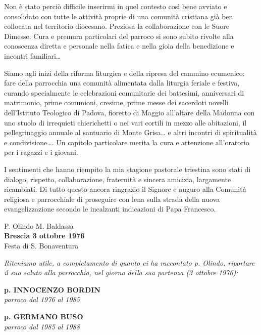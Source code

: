 Non è stato perciò difficile inserirmi in quel contesto così bene avviato e consolidato con tutte le attività proprie di una comunità cristiana già ben collocata nel territorio diocesano. Preziosa la collaborazione con le Suore Dimesse. Cura e premura particolari del parroco si sono subito rivolte alla conoscenza diretta e personale nella fatica e nella gioia della benedizione e incontri familiari… 

Siamo agli inizi della riforma liturgica e della ripresa del cammino ecumenico: fare della parrocchia una comunità alimentata dalla liturgia feriale e festiva, curando specialmente le celebrazioni comunitarie dei battesimi, anniversari di matrimonio, prime comunioni, cresime, prime messe dei sacerdoti novelli dell’Istituto Teologico di Padova, fioretto di Maggio all’altare della Madonna con uno stuolo di irrequieti chierichetti o nei vari cortili in mezzo alle abitazioni, il pellegrinaggio annuale al santuario di Monte Grisa… e altri incontri di spiritualità e condivisione…. Un capitolo particolare merita la cura e attenzione all’oratorio per i ragazzi e i giovani. 

I sentimenti che hanno riempito la mia stagione pastorale triestina sono stati di dialogo, rispetto, collaborazione, fraternità e sincera amicizia, largamente ricambiati. Di tutto questo ancora ringrazio il Signore e auguro alla Comunità religiosa e parrocchiale di proseguire con lena sulla strada della nuova evangelizzazione secondo le incalzanti indicazioni di Papa Francesco. 
\begin{flushright}
P. Olindo M. Baldassa\\
\textbf{Brescia 3 ottobre 1976}\\[0.25cm]
Festa di S. Bonaventura
\end{flushright}
\bigbreak
\textit{Riteniamo utile, a completamento di quanto ci ha raccontato p. Olindo, riportare il suo saluto alla parrocchia, nel giorno della sua partenza (3 ottobre 1976):}



\bigbreak 

\begin{center}
\textbf{\Large p. INNOCENZO BORDIN}\\
	\textit{parroco dal 1976 al 1985}
\end{center}

\begin{center}
\textbf{\Large p. GERMANO BUSO}\\
	\textit{parroco dal 1985 al 1988}
\end{center}
\bigbreak 